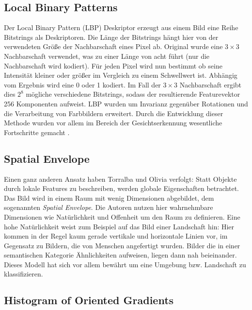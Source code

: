 \subsection{Local Binary Patterns}

Der Local Binary Pattern (LBP) Deskriptor erzeugt aus einem Bild eine Reihe Bitstrings als Deskriptoren. Die Länge der Bitstrings hängt hier von der verwendeten Größe der Nachbarschaft eines Pixel ab. Original wurde eine $3 \times 3$ Nachbarschaft verwendet, was zu einer Länge von acht führt (nur die Nachbarschaft wird kodiert). Für jeden Pixel wird nun bestimmt ob seine Intensität kleiner oder größer im Vergleich zu einem Schwellwert ist. Abhängig vom Ergebnis wird eine 0 oder 1 kodiert. Im Fall der $3 \times 3$ Nachbarschaft ergibt dies $2^8$ mögliche verschiedene Bitstrings, sodass der resultierende Featurevektor 256 Komponenten aufweist. LBP wurden um Invarianz gegenüber Rotationen und die Verarbeitung von Farbbildern erweitert. Durch die Entwicklung dieser Methode wurden vor allem im Bereich der Gesichtserkennung wesentliche Fortschritte gemacht \cite{lbp2002}. 

\subsection{Spatial Envelope}

Einen ganz anderen Ansatz haben Torralba und Olivia \cite{mts2001} verfolgt: Statt Objekte durch lokale Features zu beschreiben, werden globale Eigenschaften betrachtet. Das Bild wird in einem Raum mit wenig Dimensionen abgebildet, dem sogenannten \textit{Spatial Envelope}. Die Autoren nutzen hier wahrnehmbare Dimensionen wie Natürlichkeit und Offenheit um den Raum zu definieren. Eine hohe Natürlichkeit weist zum Beispiel auf das Bild einer Landschaft hin: Hier kommen in der Regel kaum gerade vertikale und horizontale Linien vor, im Gegensatz zu Bildern, die von Menschen angefertigt wurden.  Bilder die in einer semantischen Kategorie Ähnlichkeiten aufweisen, liegen dann nah beieinander. Dieses Modell hat sich vor allem bewährt um eine Umgebung bzw. Landschaft zu klassifizieren. 

\subsection{Histogram of Oriented Gradients}


